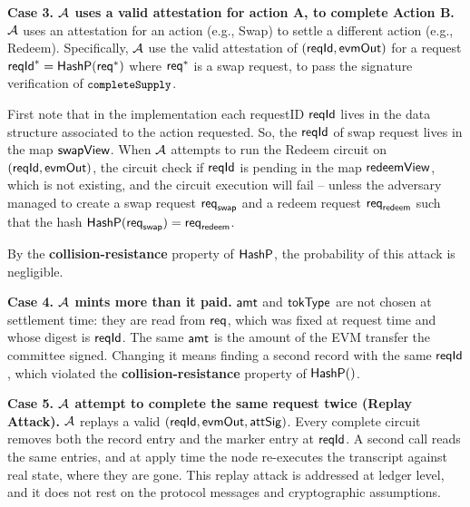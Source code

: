 \vspace{8pt}
\noindent
\textbf{Case 3.  $\mathcal{A}$ uses a valid attestation for action A, to complete  Action B.}
   $\mathcal{A}$ uses an attestation for an action (e.g., Swap) to settle  a different action (e.g., Redeem).
   Specifically, $\mathcal{A}$ use the valid attestation of $(\mathsf{reqId},\mathsf{evmOut})$  for a request $\mathsf{reqId}^*=\mathsf{HashP}(\mathsf{req}^*)$ where $\mathsf{req}^*$ is a swap request, to pass the signature verification of $\texttt{\small completeSupply}$.

   First note that in the implementation each requestID $\mathsf{reqId}$ lives in the data structure associated  to the action requested. So,
   the $\mathsf{reqId}$ of swap request lives in the map $\mathsf{swapView}$.
    When $\mathcal{A}$ attempts to run the Redeem circuit on
    $(\mathsf{reqId},\mathsf{evmOut})$, the circuit check if $\mathsf{reqId}$ is pending in the map $\mathsf{redeemView}$, which is not existing, and the circuit execution will fail -- unless the adversary managed to create a swap request $\mathsf{req}_{\mathsf{swap}}$ and a redeem request $\mathsf{req}_{\mathsf{redeem}}$ such that the hash $\mathsf{HashP}(\mathsf{req}_{\mathsf{swap}})=\mathsf{req}_{\mathsf{redeem}}$.

    By the \textbf{collision-resistance} property of $\mathsf{HashP}$, the probability of this attack is negligible.


 \vspace{8pt}
\noindent
 \textbf{Case 4. $\mathcal{A}$ mints more than it paid.}
      $\mathsf{amt}$ and $\mathsf{tokType}$ are not chosen at settlement time: they are read from $\mathsf{req}$, which was
      fixed at request time and whose digest is $\mathsf{reqId}$. The same $\mathsf{amt}$ is the amount of the EVM
      transfer the committee signed. Changing it means finding a second record with the same $\mathsf{reqId}$, which violated  the  \textbf{collision-resistance}  property of $\mathsf{HashP}()$.

\vspace{8pt}
\noindent
\textbf{Case 5.  $\mathcal{A}$ attempt to complete the same request twice (Replay Attack).}
   $\mathcal{A}$ replays a valid $(\mathsf{reqId}, \mathsf{evmOut}, \mathsf{attSig})$. Every complete circuit removes both the record
   entry and the marker entry at $\mathsf{reqId}$. A second call reads the
   same entries, and at apply time the node re-executes the transcript against real state, where
   they are gone. This replay attack is addressed at ledger level, and it does not rest on the protocol messages and cryptographic assumptions.
   \vspace{5pt}

